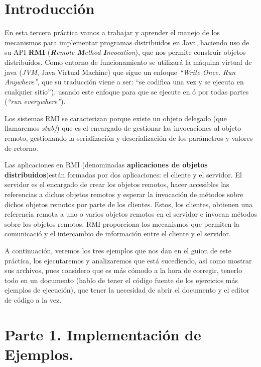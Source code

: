 \documentclass[a4paper,12pt]{article}
\begin{document}
	\tableofcontents
	\newpage %
	
	
	\section{Introducción}
		En esta tercera práctica vamos a trabajar y aprender el manejo de los mecanismos para implementar programas distribuidos en Java, haciendo uso de su API \textbf{RMI} (\textit{\textbf{R}emote \textbf{M}ethod \textbf{I}nvocation}), que nos permite construir objetos distribuidos. Como entorno de funcionamiento se utilizará la máquina virtual de java (\textit{JVM}, Java Virtual Machine) que sigue un enfoque \textit{“Write Once, Run Anywhere”}, que su traducción viene a ser: “se codifica una vez y se ejecuta en cualquier sitio”), usando este enfoque para que se ejecute en ó por todas partes (\textit{“run everywhere”}).
		
		 Los sistemas RMI se caracterizan porque existe un objeto delegado (que llamaremos \textit{stub)}) que es el encargado de gestionar las invocaciones al objeto remoto, gestionando la serialización y deserialización de los parámetros y valores de retorno. 
		 
		 Las aplicaciones en RMI (denominadas \textbf{aplicaciones de objetos distribuidos})están formadas por dos aplicaciones: el cliente y el servidor. El servidor es el encargado de crear los objetos remotos, hacer accesibles las referencias a dichos objetos remotos y esperar la invocación de métodos sobre dichos objetos remotos por parte de los clientes. Estos, los clientes, obtienen una referencia remota a uno o varios objetos remotos en el servidor e invocan métodos sobre los objetos remotos. RMI proporciona los mecanismos que permiten la comunicació y el intercambio de información entre el cliente y el servidor.
		 
		 A continuación, veremos los tres ejemplos que nos dan en el guion de este práctica, los ejecutaremos y analizaremos que está sucediendo, así como mostrar sus archivos, pues considero que es más cómodo a la hora de corregir, tenerlo todo en un documento (hablo de tener el código fuente de los ejercicios más ejemplos de ejecución), que tener la necesidad de abrir el documento y el editor de código a la vez.
		 
	\section{Parte 1. Implementación de Ejemplos.}
		
\end{document}
